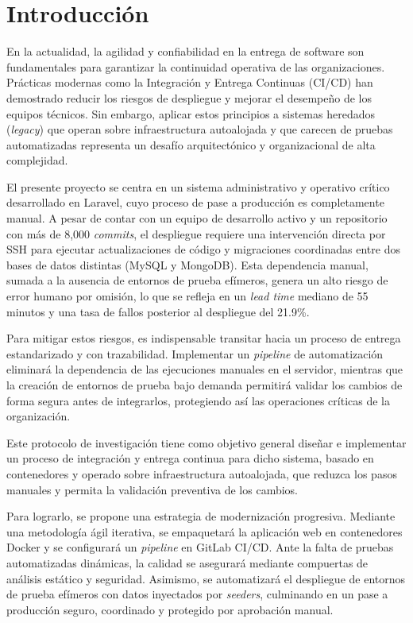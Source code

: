 \section*{Introducción}

En la actualidad, la agilidad y confiabilidad en la entrega de software son fundamentales para garantizar la continuidad operativa de las organizaciones. Prácticas modernas como la Integración y Entrega Continuas (CI/CD) han demostrado reducir los riesgos de despliegue y mejorar el desempeño de los equipos técnicos. Sin embargo, aplicar estos principios a sistemas heredados (\emph{legacy}) que operan sobre infraestructura autoalojada y que carecen de pruebas automatizadas representa un desafío arquitectónico y organizacional de alta complejidad.

El presente proyecto se centra en un sistema administrativo y operativo crítico desarrollado en Laravel, cuyo proceso de pase a producción es completamente manual. A pesar de contar con un equipo de desarrollo activo y un repositorio con más de 8,000 \emph{commits}, el despliegue requiere una intervención directa por SSH para ejecutar actualizaciones de código y migraciones coordinadas entre dos bases de datos distintas (MySQL y MongoDB). Esta dependencia manual, sumada a la ausencia de entornos de prueba efímeros, genera un alto riesgo de error humano por omisión, lo que se refleja en un \emph{lead time} mediano de 55 minutos y una tasa de fallos posterior al despliegue del 21.9\%.

Para mitigar estos riesgos, es indispensable transitar hacia un proceso de entrega estandarizado y con trazabilidad. Implementar un \emph{pipeline} de automatización eliminará la dependencia de las ejecuciones manuales en el servidor, mientras que la creación de entornos de prueba bajo demanda permitirá validar los cambios de forma segura antes de integrarlos, protegiendo así las operaciones críticas de la organización. 

Este protocolo de investigación tiene como objetivo general diseñar e implementar un proceso de integración y entrega continua para dicho sistema, basado en contenedores y operado sobre infraestructura autoalojada, que reduzca los pasos manuales y permita la validación preventiva de los cambios. 

Para lograrlo, se propone una estrategia de modernización progresiva. Mediante una metodología ágil iterativa, se empaquetará la aplicación web en contenedores Docker y se configurará un \emph{pipeline} en GitLab CI/CD. Ante la falta de pruebas automatizadas dinámicas, la calidad se asegurará mediante compuertas de análisis estático y seguridad. Asimismo, se automatizará el despliegue de entornos de prueba efímeros con datos inyectados por \emph{seeders}, culminando en un pase a producción seguro, coordinado y protegido por aprobación manual.


